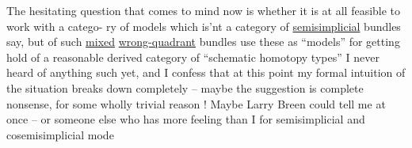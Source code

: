 The hesitating question that
comes to mind now is whether it is at all feasible to work with a catego-%
ry of models which is'nt a category of \uline{semisimplicial} bundles say, but
 of such \uline{mixed} \uline{wrong-quadrant} bundles\over{,}{;}   use these as ``models'' for
getting hold of a reasonable derived category of ``schematic homotopy
types'' I never heard of anything such yet, and I confess that at this
point my  formal intuition of the situation breaks down completely --
maybe the suggestion is complete nonsense, for some wholly trivial
reason ! Maybe Larry Breen could tell me at once -- or someone else
who has more feeling than I for semisimplicial and cosemisimplicial mode

